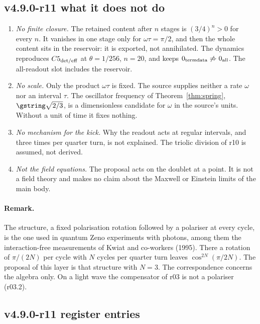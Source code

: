 \subsection*{v4.9.0-r11 what it does not do}
\label{subsec:v490-r11-limits}

\begin{enumerate}[leftmargin=2em]
\item \emph{No finite closure.}  The retained content after \(n\) stages is \((3/4)^n>0\) for every \(n\).  It vanishes in
one stage only for \(\omega\tau=\pi/2\), and then the whole content sits in the reservoir: it is exported, not annihilated.
The dynamics reproduces \(C5_{\rm det/eff}\) at \(\theta=1/256\), \(n=20\), and keeps
\(0_{\rm termdata}\not\Rightarrow0_{\rm all}\).  The all-readout slot includes the reservoir.
\item \emph{No scale.}  Only the product \(\omega\tau\) is fixed.  The source supplies neither a rate \(\omega\) nor an interval
\(\tau\).  The oscillator frequency of Theorem~\ref{thm:spring}, \(\gstring\sqrt{2/3}\), is a dimensionless candidate for
\(\omega\) in the source's units.  Without a unit of time it fixes nothing.
\item \emph{No mechanism for the kick.}  Why the readout acts at regular intervals, and three times per quarter turn, is
not explained.  The triolic division of r10 is assumed, not derived.
\item \emph{Not the field equations.}  The proposal acts on the doublet at a point.  It is not a field theory and makes no
claim about the Maxwell or Einstein limits of the main body.
\end{enumerate}

\paragraph{Remark.}
The structure, a fixed polarisation rotation followed by a polariser at every cycle, is the one used in quantum Zeno
experiments with photons, among them the interaction-free measurements of Kwiat and co-workers (1995).  There a rotation of
\(\pi/(2N)\) per cycle with \(N\) cycles per quarter turn leaves \(\cos^{2N}(\pi/2N)\).  The proposal of this layer is that
structure with \(N=3\).  The correspondence concerns the algebra only.  On a light wave the compensator of r03 is not a
polariser (r03.2).

\subsection*{v4.9.0-r11 register entries}
\label{subsec:v490-r11-register}

